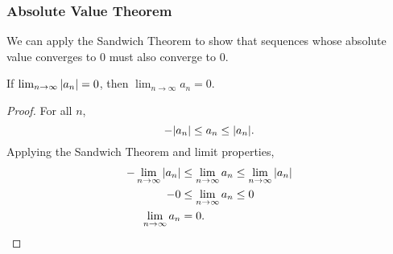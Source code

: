 \subsubsection{Absolute Value Theorem}
We can apply the Sandwich Theorem to show that sequences whose absolute value converges to 0 must also converge to 0.
\begin{theorem}
	If $\lim_{n\to\infty}{\lvert a_n \rvert} = 0$, then $\lim_{n\to\infty}{a_n} = 0$.
\end{theorem}
\begin{proof}
	For all $n$,
	\begin{equation*}
		-\lvert a_n \rvert \leq a_n \leq \lvert a_n \rvert.
	\end{equation*}
	Applying the Sandwich Theorem and limit properties,
	\begin{align*}
		-\lim_{n\to\infty}{\lvert a_n \rvert} &\leq \lim_{n\to\infty}{a_n} \leq \lim_{n\to\infty}{\lvert a_n \rvert} \\
		-0 &\leq \lim_{n\to\infty}{a_n} \leq 0 \\
		\lim_{n\to\infty}{a_n} &= 0.
	\end{align*}
\end{proof}